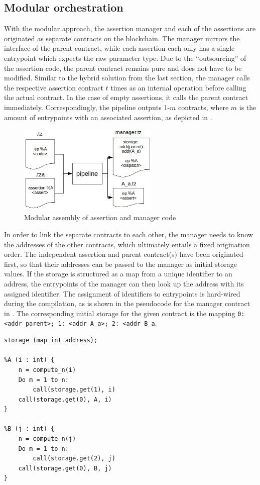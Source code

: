 \subsection{Modular orchestration}\label{sec:modular}
With the modular approach, the assertion manager and each of the assertions are originated as separate contracts on the blockchain. The manager mirrors the interface of the parent contract, while each assertion each only has a single entrypoint which expects the raw parameter type. Due to the ``outsourcing'' of the assertion code, the parent contract remains pure and does not have to be modified. Similar to the hybrid solution from the last section, the manager calls the respective assertion contract $t$ times as an internal operation before calling the actual contract. In the case of empty assertions, it calls the parent contract immediately. Correspondingly, the pipeline outputs 1-$m$ contracts, where $m$ is the amount of entrypoints with an associated assertion, as depicted in .
\begin{figure}[h]
\centering
  \includegraphics[width=0.6\textwidth]{figures/5-offline_tezos/pipeline_output_modular.jpg}
	\caption{Modular assembly of assertion and manager code}
	\label{fig:modular_assembly}
\end{figure}

In order to link the separate contracts to each other, the manager needs to know the addresses of the other contracts, which ultimately entails a fixed origination order. The independent assertion and parent contract(s) have been originated first, so that their addresses can be passed to the manager as initial storage values. If the storage is structured as a map from a unique identifier to an address, the entrypoints of the manager can then look up the address with its assigned identifier. The assignment of identifiers to entrypoints is hard-wired during the compilation, as is shown in the pseudocode for the manager contract in . The corresponding initial storage for the given contract is the mapping \texttt{{0: <addr parent>; 1: <addr A\_a>; 2: <addr B\_a}}.
\begin{lstlisting}[label=lst:manager_modular, caption=Implementation of the modular manager in pseudocode]
storage (map int address);

%A (i : int) {
	n = compute_n(i)
	Do m = 1 to n:
		call(storage.get(1), i)
	call(storage.get(0), A, i)
}

%B (j : int) {
	n = compute_n(j)
	Do m = 1 to n:
		call(storage.get(2), j)
	call(storage.get(0), B, j)
}
\end{lstlisting}

